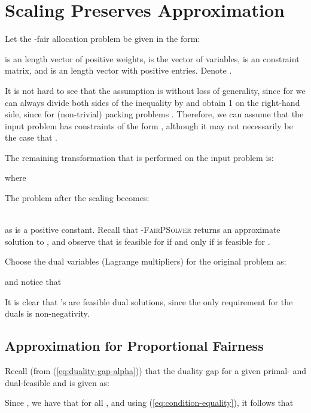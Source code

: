 \documentclass[11pt]{article}
\begin{document}
\section{Scaling Preserves Approximation}\label{appendix:scaling}

Let the -fair allocation problem be given in the form:


\noindent  is an length vector of positive weights,  is the vector of variables,  is an  constraint matrix, and  is an length vector with positive entries. Denote .

It is not hard to see that the assumption   is without loss of generality, since for  we can always divide both sides of the inequality by  and obtain 1 on the right-hand side, since for (non-trivial) packing problems . Therefore, we can assume that the input problem has constraints of the form , although it may not necessarily be the case that  .

The remaining transformation that is performed on the input problem is:

where 


The problem  after the scaling becomes:

\begin{minipage}{.4\linewidth}

\end{minipage}

\begin{minipage}{.4\linewidth}

\end{minipage}\\
as  is a positive constant. Recall that \textsc{-FairPSolver} returns an approximate solution to , and observe that  is feasible for  if and only if  is feasible for .

Choose the dual variables (Lagrange multipliers) for the original problem  as:

and notice that 

It is clear that 's are feasible dual solutions, since the only requirement for the duals is non-negativity.

\subsection{Approximation for Proportional Fairness} 

Recall (from (\ref{eq:duality-gap-alpha})) that the duality gap for a given primal- and dual-feasible  and  is given as:

Since , we have that  for all , and using (\ref{eq:condition-equality}), it follows that
\end{document}
